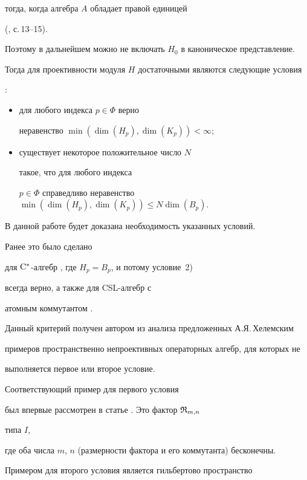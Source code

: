 тогда, когда алгебра $A$ обладает правой единицей


(\cite{Chel4}, с.\,13--15).


Поэтому в дальнейшем можно не включать $H_0$ в каноническое представление.


Тогда для проективности модуля $H$ достаточными являются следующие условия


\cite {Chel5}:


\begin{itemize}


\item[1)] для любого индекса $p \in \Phi$ верно 


неравенство $\min (\dim (H_p),\dim (K_p))<\infty$;


\item[2)] существует некоторое положительное число $N$ 


такое, что для любого индекса


$p \in \Phi$ справедливо неравенство $\min (\dim (H_p),\dim (K_p)) \le N


\dim (B_p)$.


\end{itemize}





В данной работе будет доказана необходимость указанных условий.


Ранее это было сделано


для $\mathrm C^*$-алгебр \cite{Chel4}, где $H_p=B_p$, и потому условие~2)


всегда верно, а также для  CSL-алгебр с


атомным коммутантом \cite {Gol}.





Данный критерий получен автором из анализа предложенных А.Я.\,Хелемским


примеров пространственно непроективных операторных алгебр, для которых не


выполняется первое или второе условие. 


Соответствующий пример для первого условия


был впервые рассмотрен в статье \cite {Chel5}. Это фактор ${\frak R}_{m,n}$


типа $I$,


где оба числа $m$, $n$ (размерности фактора и его коммутанта) бесконечны.


Примером для второго условия является гильбертово пространство



